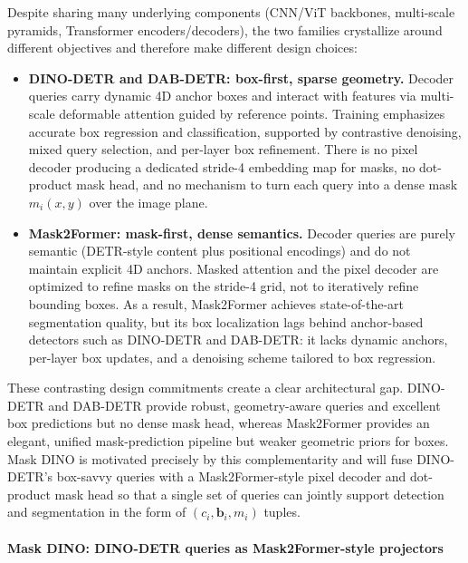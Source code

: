 \begin{enrichment}
\begin{enrichment}
	 	Despite sharing many underlying components (CNN/ViT backbones, multi-scale pyramids, Transformer encoders/decoders), the two families crystallize around different objectives and therefore make different design choices:
	 	
	 	\begin{itemize}
	 		\item \textbf{DINO-DETR and DAB-DETR: box-first, sparse geometry.} Decoder queries carry dynamic 4D anchor boxes and interact with features via multi-scale deformable attention guided by reference points. Training emphasizes accurate box regression and classification, supported by contrastive denoising, mixed query selection, and per-layer box refinement. There is no pixel decoder producing a dedicated stride-4 embedding map for masks, no dot-product mask head, and no mechanism to turn each query into a dense mask \(m_i(x,y)\) over the image plane.
	 		
	 		\item \textbf{Mask2Former: mask-first, dense semantics.} Decoder queries are purely semantic (DETR-style content plus positional encodings) and do not maintain explicit 4D anchors. Masked attention and the pixel decoder are optimized to refine masks on the stride-4 grid, not to iteratively refine bounding boxes. As a result, Mask2Former achieves state-of-the-art segmentation quality, but its box localization lags behind anchor-based detectors such as DINO-DETR and DAB-DETR: it lacks dynamic anchors, per-layer box updates, and a denoising scheme tailored to box regression.
	 	\end{itemize}
	 	
	 	These contrasting design commitments create a clear architectural gap. DINO-DETR and DAB-DETR provide robust, geometry-aware queries and excellent box predictions but no dense mask head, whereas Mask2Former provides an elegant, unified mask-prediction pipeline but weaker geometric priors for boxes. Mask DINO is motivated precisely by this complementarity and will fuse DINO-DETR's box-savvy queries with a Mask2Former-style pixel decoder and dot-product mask head so that a single set of queries can jointly support detection and segmentation in the form of \((c_i, \mathbf{b}_i, m_i)\) tuples.
		
		\paragraph{Mask DINO: DINO-DETR queries as Mask2Former-style projectors}
		

\end{enrichment}
\end{enrichment}
